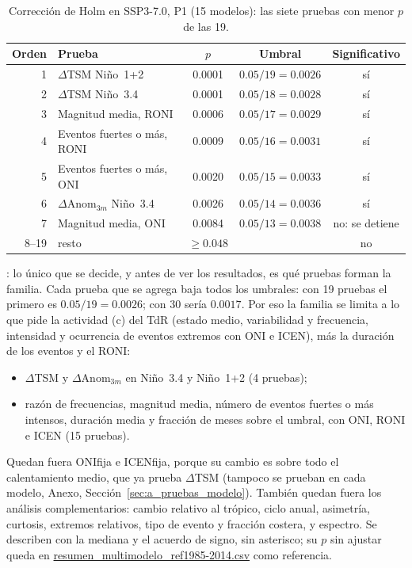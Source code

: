 \documentclass[11pt,a4paper]{article}
\newcommand{\archivo}[1]{\begingroup\hypersetup{urlcolor=black}\url{#1}\endgroup}
\begin{document}
\begin{table}[htbp]
\centering
\small
\caption{Corrección de Holm en SSP3-7.0, P1 (15 modelos): las siete pruebas con menor $p$ de las 19.}
\label{tab:holm}
\begin{tabular}{rlccc}
\toprule
Orden & Prueba & $p$ & Umbral & Significativo \\
\midrule
1 & $\Delta$TSM Niño~1+2 & 0.0001 & $0.05/19 = 0.0026$ & sí \\
2 & $\Delta$TSM Niño~3.4 & 0.0001 & $0.05/18 = 0.0028$ & sí \\
3 & Magnitud media, RONI & 0.0006 & $0.05/17 = 0.0029$ & sí \\
4 & Eventos fuertes o más, RONI & 0.0009 & $0.05/16 = 0.0031$ & sí \\
5 & Eventos fuertes o más, ONI & 0.0020 & $0.05/15 = 0.0033$ & sí \\
6 & $\Delta\mathrm{Anom}_{3m}$ Niño~3.4 & 0.0026 & $0.05/14 = 0.0036$ & sí \\
7 & Magnitud media, ONI & 0.0084 & $0.05/13 = 0.0038$ & no: se detiene \\
8--19 & resto & $\geq 0.048$ & & no \\
\bottomrule
\end{tabular}
\end{table}

: lo único que se decide, y antes de ver los resultados, es qué pruebas forman la familia.
Cada prueba que se agrega baja todos los umbrales: con 19 pruebas el primero es $0.05/19 = 0.0026$; con 30 sería $0.0017$.
Por eso la familia se limita a lo que pide la actividad (c) del TdR (estado medio, variabilidad y frecuencia, intensidad y ocurrencia de eventos extremos con ONI e ICEN), más la duración de los eventos y el RONI:
\begin{itemize}[nosep,leftmargin=*]
\item $\Delta$TSM y $\Delta\mathrm{Anom}_{3m}$ en Niño~3.4 y Niño~1+2 (4 pruebas);
\item razón de frecuencias, magnitud media, número de eventos fuertes o más intensos, duración media y fracción de meses sobre el umbral, con ONI, RONI e ICEN (15 pruebas).
\end{itemize}
Quedan fuera ONIfija e ICENfija, porque su cambio es sobre todo el calentamiento medio, que ya prueba $\Delta$TSM (tampoco se prueban en cada modelo, Anexo, Sección~\ref{sec:a_pruebas_modelo}).
También quedan fuera los análisis complementarios: cambio relativo al trópico, ciclo anual, asimetría, curtosis, extremos relativos, tipo de evento y fracción costera, y espectro.
Se describen con la mediana y el acuerdo de signo, sin asterisco; su $p$ sin ajustar queda en \archivo{resumen\_multimodelo\_ref1985-2014.csv} como referencia.
\end{document}
